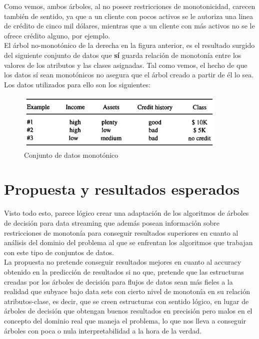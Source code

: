 Como vemos, ambos árboles, al no poseer restricciones de monotonicidad, carecen también de sentido, ya que a un cliente con pocos activos se le autoriza una linea de crédito de cinco mil dólares, mientras que a un cliente con más activos no se le ofrece crédito alguno, por ejemplo.\\

El árbol no-monotónico de la derecha en la figura anterior, es el resultado surgido del siguiente conjunto de datos que \textbf{sí} guarda relación de monotonía entre los valores de los atributos y las clases asignadas. Tal como vemos, el hecho de que los datos sí sean monotónicos no asegura que el árbol creado a partir de él lo sea.\\
Los datos utilizados para ello son los siguientes:

\begin{figure}[H]
	\centering
	\includegraphics[width=0.9\textwidth]{imagenes/tablaEj} 
	\caption{Conjunto de datos monotónico\cite{ref14}}
\end{figure}

\section{Propuesta y resultados esperados}

Visto todo esto, parece lógico crear una adaptación de los algoritmos de árboles de decisión para data streaming que además posean información sobre restricciones de monotonía para conseguir resultados superiores en cuanto al análisis del dominio del problema al que se enfrentan los algoritmos que trabajan con este tipo de conjuntos de datos.\\

La propuesta no pretende conseguir resultados mejores en cuanto al accuracy obtenido en la predicción de resultados si no que, pretende que las estructuras creadas por los árboles de decisión para flujos de datos sean más fieles a la realidad que subyace bajo data sets con cierto nivel de monotonía en su relación atributos-clase, es decir, que se creen estructuras con sentido lógico, en lugar de árboles de decisión que obtengan buenos resultados en precisión pero malos en el concepto del dominio real que maneja el problema, lo que nos lleva a conseguir árboles con poca o nula interpretabilidad a la hora de la verdad.\\

